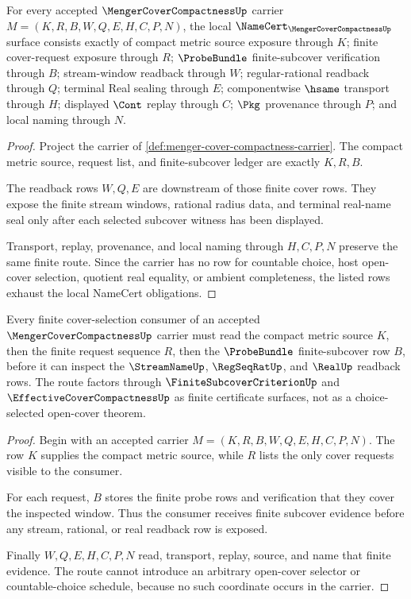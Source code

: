 \begin{theorem}
\label{thm:menger-cover-compactness-namecert-obligations}
For every accepted $\MengerCoverCompactnessUp$ carrier $M=(K,R,B,W,Q,E,H,C,P,N)$, the local $\NameCert_{\MengerCoverCompactnessUp}$ surface consists exactly of compact metric source exposure through $K$; finite cover-request exposure through $R$; $\ProbeBundle$ finite-subcover verification through $B$; stream-window readback through $W$; regular-rational readback through $Q$; terminal Real sealing through $E$; componentwise $\hsame$ transport through $H$; displayed $\Cont$ replay through $C$; $\Pkg$ provenance through $P$; and local naming through $N$.
\end{theorem}
\begin{proof}
Project the carrier of \autoref{def:menger-cover-compactness-carrier}. The compact metric source, request list, and finite-subcover ledger are exactly $K,R,B$.

The readback rows $W,Q,E$ are downstream of those finite cover rows. They expose the finite stream windows, rational radius data, and terminal real-name seal only after each selected subcover witness has been displayed.

Transport, replay, provenance, and local naming through $H,C,P,N$ preserve the same finite route. Since the carrier has no row for countable choice, host open-cover selection, quotient real equality, or ambient completeness, the listed rows exhaust the local NameCert obligations.
\end{proof}

\begin{theorem}
\label{thm:menger-cover-compactness-finite-cover-selection}
Every finite cover-selection consumer of an accepted $\MengerCoverCompactnessUp$ carrier must read the compact metric source $K$, then the finite request sequence $R$, then the $\ProbeBundle$ finite-subcover row $B$, before it can inspect the $\StreamNameUp$, $\RegSeqRatUp$, and $\RealUp$ readback rows. The route factors through $\FiniteSubcoverCriterionUp$ and $\EffectiveCoverCompactnessUp$ as finite certificate surfaces, not as a choice-selected open-cover theorem.
\end{theorem}
\begin{proof}
Begin with an accepted carrier $M=(K,R,B,W,Q,E,H,C,P,N)$. The row $K$ supplies the compact metric source, while $R$ lists the only cover requests visible to the consumer.

For each request, $B$ stores the finite probe rows and verification that they cover the inspected window. Thus the consumer receives finite subcover evidence before any stream, rational, or real readback row is exposed.

Finally $W,Q,E,H,C,P,N$ read, transport, replay, source, and name that finite evidence. The route cannot introduce an arbitrary open-cover selector or countable-choice schedule, because no such coordinate occurs in the carrier.
\end{proof}

